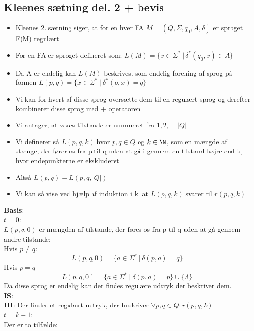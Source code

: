 \documentclass[a4, danish]{article}
\begin{document}
  \subsection{Kleenes sætning del. 2 + bevis}
  \begin{itemize}
	  \item Kleenes 2. sætning siger, at for en hver FA $M=(Q,\Sigma,q_0,A,\delta)$ er sproget F(M) regulært
    \item For en FA er sproget defineret som: $L(M)=\{ x\in \Sigma^* \ | \ \delta^*(q_0,x)\in A \}$
    \item Da A er endelig kan $L(M)$ beskrives, som endelig forening af sprog på formen $L(p,q)=\{x\in \Sigma^* \ | \ \delta^*(p,x)=q \}$
    \item Vi kan for hvert af disse sprog oversætte dem til en regulært sprog og derefter kombinerer disse sprog med + operatoren 
    \item Vi antager, at vores tilstande er nummeret fra $1, 2, .... |Q|$
    \item Vi definerer så $L(p,q,k)$ hvor $p,q\in Q$ og $k\in \N$, som en mængde af strenge, der fører os fra p til q uden at gå i gennem en tilstand højre end k, hvor endepunkterne er ekskluderet
    \item Altså $L(p,q)=L(p,q,|Q|)$
    \item Vi kan så vise ved hjælp af induktion i k, at $L(p,q,k)$ svarer til $r(p,q,k)$ 
  \end{itemize}
  \textbf{Basis:}\\
  $t=0$: \\
   $L(p,q,0)$ er mængden af tilstande, der føres os fra p til q uden at gå gennem andre tilstande: \\
  Hvis $p\neq q$:
  \begin{equation*}
    L(p,q,0)=\{a\in \Sigma^* \ | \ \delta(p,a)=q \}
  \end{equation*}
  Hvis $p=q$
  \begin{equation*}
    L(p,q,0)= \{a\in \Sigma^* \ | \ \delta(p,a)=p \} \cup \{ \Lambda \}
  \end{equation*}
  Da disse sprog er endelig kan der findes regulære udtryk der beskriver dem. \\
  \textbf{IS}: \\
  \textbf{IH}: Der findes et regulært udtryk, der beskriver $\forall p, q \in Q: r(p,q,k)$\\
  $t=k+1$: \\
  Der er to tilfælde:
\end{document}
